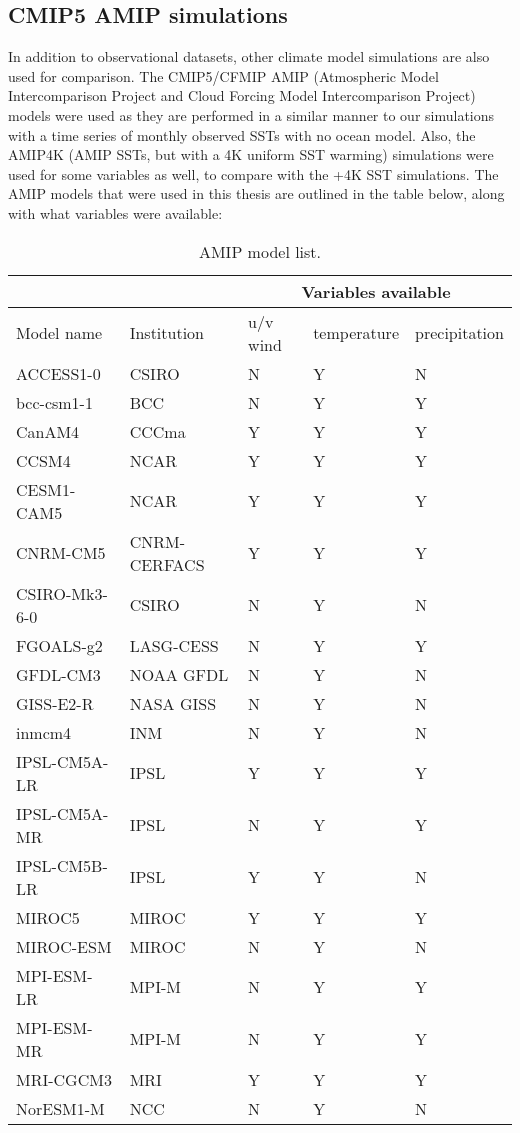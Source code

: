 \documentclass[letterpaper,12pt,titlepage,oneside,final]{book}
\begin{document}
\subsection{CMIP5 AMIP simulations}
In addition to observational datasets, other climate model simulations are also used for comparison. The CMIP5/CFMIP AMIP (Atmospheric Model Intercomparison Project and Cloud Forcing Model Intercomparison Project) \citep{bony_cfmip:_2011} models were used as they are performed in a similar manner to our simulations with a time series of monthly observed SSTs with no ocean model. Also, the AMIP4K (AMIP SSTs, but with a 4K uniform SST warming) simulations were used for some variables as well, to compare with the +4K SST simulations. The AMIP models that were used in this thesis are outlined in the table below, along with what variables were available:

\begin{table}[H]
\caption{\footnotesize AMIP model list.}
\label{tab:amip}
\begin{tabular}{|p{4cm}||p{3.5cm}|p{2cm}|p{2.25cm}|p{2.25cm}|}
\hline
&&\multicolumn{3}{|c|}{Variables available}\\
\hline
Model name&Institution&u/v wind&temperature&precipitation\\ \hline
ACCESS1-0&CSIRO&N&Y&N\\   \hline
bcc-csm1-1&BCC&N&Y&Y\\ \hline
CanAM4&CCCma&Y&Y&Y\\ \hline
CCSM4&NCAR&Y&Y&Y\\ \hline
CESM1-CAM5&NCAR&Y&Y&Y\\ \hline
CNRM-CM5&CNRM-CERFACS&Y&Y&Y\\ \hline
CSIRO-Mk3-6-0&CSIRO&N&Y&N\\ \hline
FGOALS-g2&LASG-CESS&N&Y&Y\\ \hline
GFDL-CM3&NOAA GFDL&N&Y&N\\ \hline
GISS-E2-R&NASA GISS&N&Y&N\\ \hline
inmcm4&INM&N&Y&N\\ \hline
IPSL-CM5A-LR&IPSL&Y&Y&Y\\ \hline
IPSL-CM5A-MR&IPSL&N&Y&Y\\ \hline
IPSL-CM5B-LR&IPSL&Y&Y&N\\ \hline
MIROC5&MIROC&Y&Y&Y\\ \hline
MIROC-ESM&MIROC&N&Y&N\\ \hline
MPI-ESM-LR&MPI-M&N&Y&Y\\ \hline
MPI-ESM-MR&MPI-M&N&Y&Y\\ \hline
MRI-CGCM3&MRI&Y&Y&Y\\ \hline
NorESM1-M&NCC&N&Y&N\\ \hline

\end{tabular}
\end{table}
\end{document}
